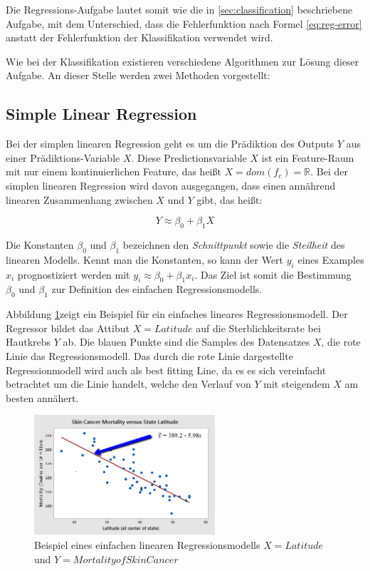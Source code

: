 Die Regressions-Aufgabe lautet somit wie die in \ref{sec:classification} beschriebene Aufgabe, mit dem Unterschied, dass die Fehlerfunktion nach Formel \ref{eq:reg-error} anstatt der Fehlerfunktion der Klassifikation verwendet wird. \cite[S. 25]{learning_cart_dobra}

Wie bei der Klassifikation existieren verschiedene Algorithmen zur Lösung dieser Aufgabe. An dieser Stelle werden zwei Methoden vorgestellt:

\subsection{Simple Linear Regression}

Bei der simplen linearen Regression geht es um die Prädiktion des Outputs $Y$ aus einer Prädiktions-Variable $X$. Diese Predictionsvariable $X$ ist ein Feature-Raum mit nur einem kontinuierlichen Feature, das heißt $X = dom(f_c) = \mathbb{R}$. Bei der simplen linearen Regression wird davon ausgegangen, dass einen annährend linearen Zusammenhang zwischen $X$ und $Y$ gibt, das heißt: \cite[S. 61]{statistical_learning}

\begin{equation}
\label{eq:linearRegressionModel}
Y \approx \beta_0 + \beta_1 X
\end{equation}

Die Konstanten $\beta_0$ und  $\beta_1$ bezeichnen den \emph{Schnittpunkt} sowie die \emph{Steilheit} des linearen Modells. Kennt man die Konstanten, so kann der Wert $y_i$ eines Examples $x_i$ prognostiziert werden mit $y_i \approx \beta_0 + \beta_1 x_i$. Das Ziel ist somit die Bestimmung $\beta_0$ und  $\beta_1$ zur Definition des einfachen Regressionsmodells.

Abbildung \ref{img:skin_cancer}zeigt ein Beispiel für ein einfaches lineares Regressionsmodell. Der Regressor bildet das Attibut  $X = Latitude$ auf die Sterblichkeitsrate bei Hautkrebs $Y$ ab. Die blauen Punkte sind die Samples des Datensatzes $X$, die rote Linie das Regressionsmodell. Das durch die rote Linie dargestellte Regressionmodell wird auch als \glqq best fitting Line\grqq{}, da es es sich vereinfacht betrachtet um die Linie handelt, welche den Verlauf von $Y$ mit steigendem $X$ am besten annähert. \cite[What is Simple Linear Regression?]{regression_lecture}

\begin{figure}[h]
	\centering
	\includegraphics[width=0.6\textwidth]{bilder/skin_cancer.png}
	\caption{Beispiel eines einfachen linearen Regressionsmodells $X = Latitude$ und $Y = Mortality of Skin Cancer$ \cite{regression_lecture}}
	\label{img:skin_cancer}
\end{figure}

